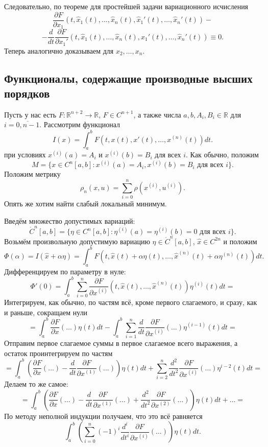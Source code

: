 Следовательно, по теореме для простейшей задачи вариационного исчисления
\[
    \frac{\partial F}{\partial x_1}(t, \widehat x_1(t), \dots, \widehat x_n(t), \widehat x_1'(t), \dots, \widehat x_n'(t)) -
\]
\[
    - \frac{d}{dt} \frac{\partial F}{\partial x_1'}(t, \widehat x_1(t), \dots, \widehat x_n(t), \widehat x_1'(t), \dots, \widehat x_n'(t)) \equiv 0.
\]
Теперь аналогично доказываем для $x_2, \dots, x_n$.

\QED

\subsection{Функционалы, содержащие производные высших порядков}
Пусть у нас есть $F: \mathbb R^{n + 2} \to \mathbb R$, $F \in C^{n+1}$, а также числа $a, b, A_i, B_i \in \mathbb R$ для $i = \overline{0, n - 1}$.
Рассмотрим функционал
\begin{equation}
    I(x) = \int_a^b F(t, x(t), x'(t), \dots, x^{(n)}(t)) dt.
\end{equation}
при условиях $x^{(i)}(a) = A_i$ и $x^{(i)}(b) = B_i$ для всех $i$.
Как обычно, положим
\[
    M = \{x \in C^n[a, b]: x^{(i)}(a) = A_i, x^{(i)}(b) = B_i \text{ для всех $i$}\}.
\]
Положим метрику
\[
    \rho_n(x, u) = \sum_{i=0}^{n} \rho(x^{(i)}, u^{(i)}).
\]
Опять же хотим найти слабый локальный минимум.

Введём множество допустимых вариаций:
\[
    \mathring C^n[a, b] = \{\eta \in C^n[a, b]: \eta^{(i)}(a) = \eta^{(i)}(b) = 0 \text{ для всех $i$}\}.
\]
Возьмём произвольную допустимую вариацию $\eta \in \mathring C^n[a, b]$, $\widehat x \in C^{2n}$ и положим
\[
    \Phi(\alpha) = I(\widehat x + \alpha \eta) = \int_a^b F(t, \widehat x(t) + \alpha \eta(t), \dots, \widehat x^{(n)}(t) + \alpha \eta^{(n)}(t)) dt.
\]
Дифференцируем по параметру в нуле:
\[
    \Phi'(0) = \int_a^b \sum_{i=0}^{n} \frac{\partial F}{\partial x^{(i)}} (t, \widehat x(t), \dots, \widehat x^{(n)}(t)) \eta^{(i)}(t) dt =
\]
Интегрируем, как обычно, по частям всё, кроме первого слагаемого, и сразу, как и раньше, сокращаем нули
\[
    = \int_a^b \frac{\partial F}{\partial x}(\dots) \eta(t) dt - \int_a^b \sum_{i=1}^{n} \frac{d}{dt} \frac{\partial F}{\partial x^{(i)}}(\dots) \eta^{(i-1)}(t) dt =
\]
Отправим первое слагаемое суммы в первое слагаемое всего выражения, а остаток проинтегрируем по частям
\[
    = \int_a^b \left(\frac{\partial F}{\partial x}(\dots) - \frac{d}{dt} \frac{\partial F}{\partial x^{(1)}}(\dots) \right) \eta(t) dt + \sum_{i=2}^{n} \frac{d^2}{dt^2} \frac{\partial F}{\partial x^{(i)}}(\dots) \eta^{i-2}(t) dt =
\]
Делаем то же самое:
\[
    = \int_a^b \left( \frac{\partial F}{\partial x} (\dots) - \frac{d}{dt} \frac{\partial F}{\partial x^{(1)}} (\dots) + \frac{d^2}{dt^2} \frac{\partial F}{\partial x^{(2)}}(\dots) \right) \eta(t) dt + \dots =
\]
По методу неполной индукции получаем, что это всё равняется
\[
    \int_a^b \left( \sum_{i=0}^{n} (-1)^i \frac{d^i}{dt^i} \frac{\partial F}{\partial x^{(i)}} (\dots) \right) \eta(t) dt.
\]

